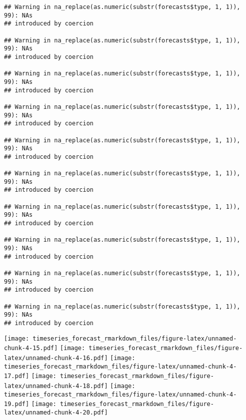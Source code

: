 \documentclass[
]{article}
\begin{document}
\begin{verbatim}
## Warning in na_replace(as.numeric(substr(forecasts$type, 1, 1)), 99): NAs
## introduced by coercion

## Warning in na_replace(as.numeric(substr(forecasts$type, 1, 1)), 99): NAs
## introduced by coercion

## Warning in na_replace(as.numeric(substr(forecasts$type, 1, 1)), 99): NAs
## introduced by coercion

## Warning in na_replace(as.numeric(substr(forecasts$type, 1, 1)), 99): NAs
## introduced by coercion

## Warning in na_replace(as.numeric(substr(forecasts$type, 1, 1)), 99): NAs
## introduced by coercion

## Warning in na_replace(as.numeric(substr(forecasts$type, 1, 1)), 99): NAs
## introduced by coercion

## Warning in na_replace(as.numeric(substr(forecasts$type, 1, 1)), 99): NAs
## introduced by coercion

## Warning in na_replace(as.numeric(substr(forecasts$type, 1, 1)), 99): NAs
## introduced by coercion

## Warning in na_replace(as.numeric(substr(forecasts$type, 1, 1)), 99): NAs
## introduced by coercion

## Warning in na_replace(as.numeric(substr(forecasts$type, 1, 1)), 99): NAs
## introduced by coercion
\end{verbatim}

\texttt{[image: timeseries\_forecast\_rmarkdown\_files/figure-latex/unnamed-chunk-4-15.pdf]}
\texttt{[image: timeseries\_forecast\_rmarkdown\_files/figure-latex/unnamed-chunk-4-16.pdf]}
\texttt{[image: timeseries\_forecast\_rmarkdown\_files/figure-latex/unnamed-chunk-4-17.pdf]}
\texttt{[image: timeseries\_forecast\_rmarkdown\_files/figure-latex/unnamed-chunk-4-18.pdf]}
\texttt{[image: timeseries\_forecast\_rmarkdown\_files/figure-latex/unnamed-chunk-4-19.pdf]}
\texttt{[image: timeseries\_forecast\_rmarkdown\_files/figure-latex/unnamed-chunk-4-20.pdf]}
\end{document}
